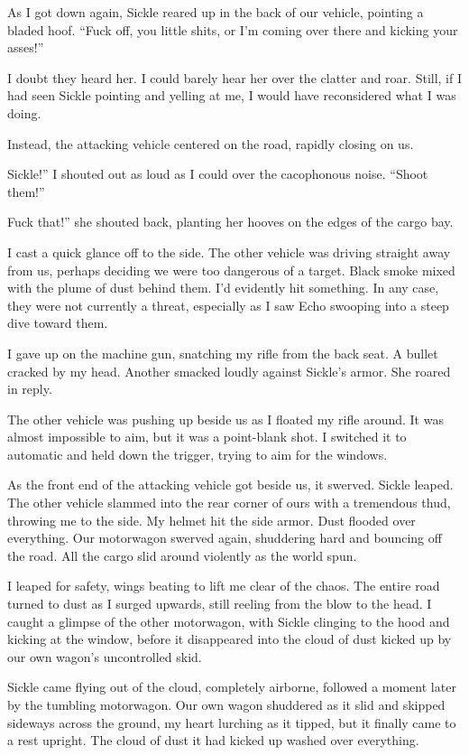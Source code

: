 As I got down again, Sickle reared up in the back of our vehicle, pointing a bladed hoof. “Fuck off, you little shits, or I’m coming over there and kicking your asses!”

I doubt they heard her. I could barely hear her over the clatter and roar. Still, if I had seen Sickle pointing and yelling at me, I would have reconsidered what I was doing.

Instead, the attacking vehicle centered on the road, rapidly closing on us.

\leavevmode{}Sickle!” I shouted out as loud as I could over the cacophonous noise. “Shoot them!”

\leavevmode{}Fuck that!” she shouted back, planting her hooves on the edges of the cargo bay.

I cast a quick glance off to the side. The other vehicle was driving straight away from us, perhaps deciding we were too dangerous of a target. Black smoke mixed with the plume of dust behind them. I’d evidently hit something. In any case, they were not currently a threat, especially as I saw Echo swooping into a steep dive toward them.

I gave up on the machine gun, snatching my rifle from the back seat. A bullet cracked by my head. Another smacked loudly against Sickle’s armor. She roared in reply.

The other vehicle was pushing up beside us as I floated my rifle around. It was almost impossible to aim, but it was a point-blank shot. I switched it to automatic and held down the trigger, trying to aim for the windows.

As the front end of the attacking vehicle got beside us, it swerved. Sickle leaped. The other vehicle slammed into the rear corner of ours with a tremendous thud, throwing me to the side. My helmet hit the side armor. Dust flooded over everything. Our motorwagon swerved again, shuddering hard and bouncing off the road. All the cargo slid around violently as the world spun.

I leaped for safety, wings beating to lift me clear of the chaos. The entire road turned to dust as I surged upwards, still reeling from the blow to the head. I caught a glimpse of the other motorwagon, with Sickle clinging to the hood and kicking at the window, before it disappeared into the cloud of dust kicked up by our own wagon’s uncontrolled skid.

Sickle came flying out of the cloud, completely airborne, followed a moment later by the tumbling motorwagon. Our own wagon shuddered as it slid and skipped sideways across the ground, my heart lurching as it tipped, but it finally came to a rest upright. The cloud of dust it had kicked up washed over everything.

